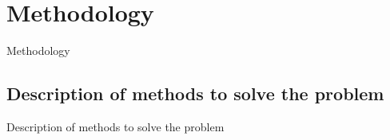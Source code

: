 \chapter{Methodology}

Methodology

\section{Description of methods to solve the problem}

Description of methods to solve the problem
